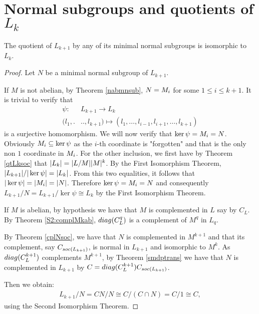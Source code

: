 \section{Normal subgroups and quotients of \texorpdfstring{$L_k$}{Lk}}

\begin{theorem}
    \label{S2:QLkmnsub}
    The quotient of $L_{k+1}$ by any of its minimal normal subgroups is isomorphic to $L_k$.
\end{theorem}

\begin{proof}
    Let $N$ be a minimal normal subgroup of $L_{k+1}$.

    If $M$ is not abelian, by Theorem \ref{nabmnsub}, $N = M_{i}$ for some $1 \le i \le k+1$. It is trivial to verify that
    \begin{align*}
        \psi \colon &L_{k+1} \longrightarrow L_k \\
                (l_1,.&..,l_{k+1}) \mapsto (l_1,\ldots ,l_{i-1},l_{i+1},\ldots ,l_{k+1})
    \end{align*}
    is a surjective homomorphism. We will now verify that $\ker \psi = M_{i} = N$. Obviously $M_{i} \subseteq \ker \psi$ as the $i$-th coordinate is "forgotten" and that is the only non $1$ coordinate in $M_{i}$. For the other inclusion, we first have by Theorem \ref{qtLksoc} that $| L_k | = | L/M | | M |^k$. By the First Isomorphism Theorem, $| L_{k+1} |/| \ker{\psi} | = | L_k |$. From this two equalities, it follows that $| \ker \psi | = | M_{i} | = | N |$. Therefore $\ker \psi = M_{i} = N$ and consequently
    $L_{k+1}/N = L_{k+1}/\ker \psi \cong L_k$ by the First Isomorphism Theorem.

    If $M$ is abelian, by hypothesis we have that $M$ is complemented in $L$ say by $C_L$. By Theorem \ref{S2:complMkab}, $diag({C_L^q})$ is a complement of $M^q$ in $L_q$.

    By Theorem \ref{cplNsoc}, we have that $N$ is complemented in $M^{k+1}$ and that its complement, say $C_{soc {(L_{k+1})}}$, is normal in $L_{k+1}$ and isomorphic to $M^{k}$. 
    As $diag({C_L^{k+1}})$ complements $M^{k+1}$, by Theorem \ref{smdptrans} we have that $N$ is complemented in $L_{k+1}$ by $C=diag({C_L^{k+1}})C_{soc {(L_{k+1})}}$.

    Then we obtain:
    \begin{align*}
        L_{k+1}/N = CN/N \cong C/(C \cap N) = C/1 \cong C,
    \end{align*}
    using the Second Isomorphism Theorem.


\end{proof}
